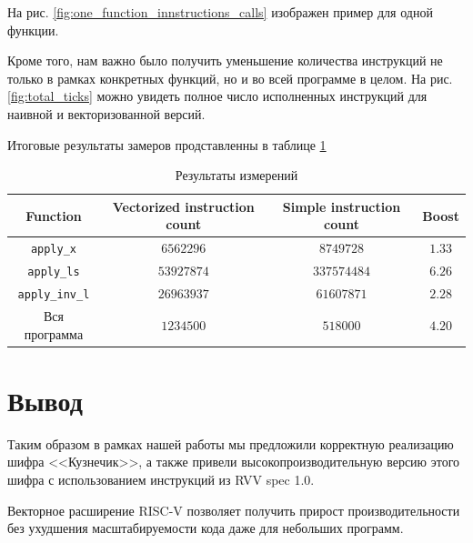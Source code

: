 \documentclass[a4paper, 12pt]{article}
\begin{document}
    На рис. \ref{fig:one_function_innstructions_calls} изображен пример для одной функции.

    Кроме того, нам важно было получить уменьшение количества инструкций не только в рамках 
    конкретных функций, но и во всей программе в целом. На рис. \ref{fig:total_ticks} можно 
    увидеть полное число исполненных инструкций для наивной и 
    векторизованной версий.

    Итоговые результаты замеров продставленны в таблице \ref{tab:results}

    \begin{table}[]
    \begin{center}
    \begin{tabular}{|c|c|c|c|}
    \hline
    \textbf{Function} & Vectorized instruction count & Simple instruction count & Boost \\ \hline
    \texttt{apply\_x}          & $6562296$                      & $8749728$                  & $1.33$  \\ \hline
    \texttt{apply\_ls}         & $53927874$                     & $337574484$                & $6.26$  \\ \hline
    \texttt{apply\_inv\_l}     & $26963937$                     & $61607871$                 & $2.28$  \\ \hline
    Вся программа     & $1234500$                      & $518000$                   & $4.20$  \\ \hline
    \end{tabular}
    \end{center}
    \caption{Результаты измерений}
    \label{tab:results}
    \end{table}

    \section{Вывод}

    Таким образом в рамках нашей работы мы предложили корректную реализацию шифра 
    <<Кузнечик>>, а также привели высокопроизводительную версию этого шифра с 
    использованием инструкций из RVV spec 1.0. 
    
    Векторное расширение RISC-V позволяет получить прирост производительности без ухудшения масштабируемости кода даже для небольших программ.
\end{document}
